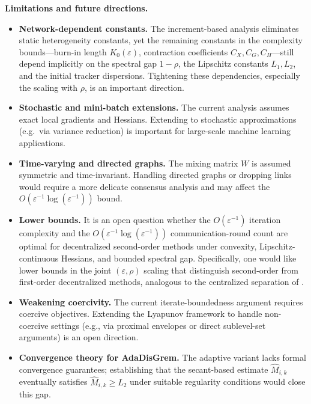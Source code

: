 \documentclass[11pt,a4paper]{article}
\def\cO{O}%
\newcommand{\cO}{\mathcal{O}}
\begin{document}
	\noindent\textbf{Limitations and future directions.}
	\begin{itemize}[leftmargin=1.2em,itemsep=2pt]
		\item \textbf{Network-dependent constants.}
		The increment-based analysis eliminates static heterogeneity
		constants, yet the remaining constants in the complexity
		bounds---burn-in length $K_0(\varepsilon)$, contraction
		coefficients $C_X, C_G, C_H$---still depend implicitly on
		the spectral gap $1{-}\rho$, the Lipschitz constants
		$L_1, L_2$, and the initial tracker dispersions.
		Tightening these dependencies, especially the scaling
		with $\rho$, is an important direction.
		\item \textbf{Stochastic and mini-batch extensions.}
		The current analysis assumes exact local gradients and Hessians.
		Extending to stochastic approximations (e.g.\ via variance reduction) is important
		for large-scale machine learning applications.
		\item \textbf{Time-varying and directed graphs.}
		The mixing matrix $W$ is assumed symmetric and time-invariant.
		Handling directed graphs or dropping links would require a more delicate consensus
		analysis and may affect the $\cO(\varepsilon^{-1}\log(\varepsilon^{-1}))$ bound.
		\item \textbf{Lower bounds.}
		It is an open question whether the $\cO(\varepsilon^{-1})$ iteration
		complexity and the $\cO(\varepsilon^{-1}\log(\varepsilon^{-1}))$
		communication-round count are optimal for decentralized
		second-order methods under convexity, Lipschitz-continuous Hessians,
		and bounded spectral gap.
		Specifically, one would like lower bounds in the joint
		$(\varepsilon,\rho)$ scaling that distinguish second-order
		from first-order decentralized methods, analogous to the
		centralized separation of \citet{nesterov2006cubic}.
		\item \textbf{Weakening coercivity.}
		The current iterate-boundedness argument requires coercive objectives.
		Extending the Lyapunov framework to handle non-coercive settings
		(e.g., via proximal envelopes or direct sublevel-set arguments) is an
		open direction.
		\item \textbf{Convergence theory for AdaDisGrem.}
		The adaptive variant lacks formal convergence guarantees;
		establishing that the secant-based estimate $\hat M_{i,k}$ eventually
		satisfies $\hat M_{i,k}\ge L_2$ under suitable regularity conditions
		would close this gap.
	\end{itemize}
	
\end{document}
